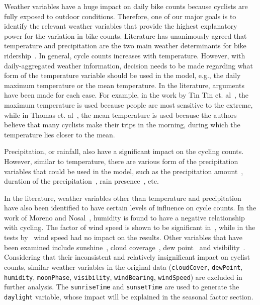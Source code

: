 \documentclass [11pt, proquest] {uwthesis}[2015/03/03]
\begin{document}
Weather variables have a huge impact on daily bike counts because cyclists are fully exposed to outdoor conditions. Therefore, one of our major goals is to identify the relevant weather variables that provide the highest explanatory power for the variation in bike counts. Literature has unanimously agreed that temperature and precipitation are the two main weather determinants for bike ridership~\cite{Nosal:2014aa,Tin:2012aa}. In general, cycle counts increases with temperature. However, with daily-aggregated weather information, decision needs to be made regarding what form of the temperature variable should be used in the model, e.g., the daily maximum temperature or the mean temperature. In the literature, arguments have been made for each case. For example, in the work by Tin Tin et. al~\cite{Tin:2012aa}, the maximum temperature is used because people are most sensitive to the extreme, while in Thomas et. al~\cite{Thomas09}, the mean temperature is used because the authors believe that many cyclists make their trips in the morning, during which the temperature lies closer to the mean.

Precipitation, or rainfall, also have a significant impact on the cycling counts. However, similar to temperature, there are various form of the precipitation variables that could be used in the model, such as the precipitation amount~\cite{Ahmed12}, duration of the precipitation~\cite{Thomas09}, rain presence~\cite{Miranda-Moreno:2011aa}, etc.

In the literature, weather variables other than temperature and precipitation have also been identified to have certain levels of influence on cycle counts. In the work of Moreno and Nosal~\cite{Miranda-Moreno:2011aa}, humidity is found to have a negative relationship with cycling. The factor of wind speed is shown to be significant in~\cite{Thomas12}, while in the tests by~\cite{Miranda-Moreno:2011aa} wind speed had no impact on the results. Other variables that have been examined include sunshine~\cite{Thomas12}, cloud coverage~\cite{Hanson77}, dew point~\cite{Schade14,Nosal:2014aa} and visibility~\cite{Thomas09}. Considering that their inconsistent and relatively insignificant impact on cyclist counts, similar weather variables in the original data (\texttt{cloudCover}, \texttt{dewPoint}, \texttt{humidity}, \texttt{moonPhase}, \texttt{visibility}, \texttt{windBearing}, \texttt{windSpeed}) are excluded in further analysis. The \texttt{sunriseTime} and \texttt{sunsetTime} are used to generate the \texttt{daylight} variable, whose impact will be explained in the seasonal factor section. 
\end{document}
